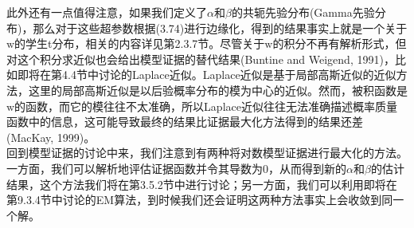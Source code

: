 \documentclass[b5paper]{book}
\numberwithin{equation}{chapter}
\newcommand {\bw} {\boldsymbol{\mathrm{w}}}
\begin{document}
{	\indent 此外还有一点值得注意，如果我们定义了$\alpha$和$\beta$的共轭先验分布(Gamma先验分布)，那么对于这些超参数根据(3.74)进行边缘化，得到的结果事实上就是一个关于$\bw$的学生t分布，相关的内容详见第2.3.7节。尽管关于$\bw$的积分不再有解析形式，但对这个积分求近似也会给出模型证据的替代结果(Buntine and Weigend, 1991)，比如即将在第4.4节中讨论的Laplace近似。Laplace近似是基于局部高斯近似的近似方法，这里的局部高斯近似是以后验概率分布的模为中心的近似。然而，被积函数是$\bw$的函数，而它的模往往不太准确，所以Laplace近似往往无法准确描述概率质量函数中的信息，这可能导致最终的结果比证据最大化方法得到的结果还差(MacKay, 1999)。\\
	\indent 回到模型证据的讨论中来，我们注意到有两种将对数模型证据进行最大化的方法。一方面，我们可以解析地评估证据函数并令其导数为0，从而得到新的$\alpha$和$\beta$的估计结果，这个方法我们将在第3.5.2节中进行讨论；另一方面，我们可以利用即将在第9.3.4节中讨论的EM算法，到时候我们还会证明这两种方法事实上会收敛到同一个解。
	}
\end{document}
